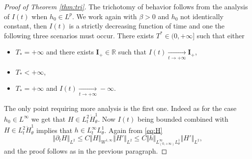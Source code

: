 \documentclass[JEP,XML,SOM,Unicode,NoFloatCountersInSection,published]{cedram}
\theoremstyle{plain}
\theoremstyle{definition}
\newcommand{\bfI}{{\mathbf I}}
\begin{document}
\begin{proof}[Proof of Theorem \ref{thm:tri}]
The trichotomy of behavior follows from the analysis of $I(t)$ when $h_0\in L^p$. We work again with $\beta>0$ and $h_0$ not identically constant, then $I(t)$ is a strictly decreasing function of time and one the following three scenarios must occur. There exists $T^*\in (0,+\infty]$ such that either
\begin{itemize}
\item $T_*=+\infty$ and there exists $\bfI_{+}\in \mathbb{R}$ such that $I(t)\underset{t\to +\infty}{\to}\bfI_{+}$,
\item $T_*<+\infty$,
\item $T_*=+\infty$ and $I(t)\underset{t\to +\infty}{\to}-\infty$.
\end{itemize}
The only point requiring more analysis is the first one. Indeed as for the case $h_0\in L^\infty$ we get that $H\in L^2_t\dot{H}^1_\theta$. Now $I(t)$ being bounded combined with $H\in L^2_t\dot{H}^1_\theta$ implies that $h\in L^\infty_t L^1_\theta$. Again from \eqref{eq:H}
\[
\left\Vert \partial_t H \right\Vert_{L^2} \leq C\left\Vert H\right\Vert_{W^{1,\infty}}\left\Vert H'\right\Vert_{L^2}\leq C \Vert h\Vert_{L^\infty_{(0,+\infty)}L^1_\theta}\left\Vert H'\right\Vert_{L^2},
\]
and the proof follows as in the previous paragraph.
\end{proof}

\end{document}
